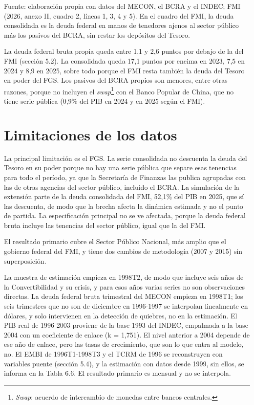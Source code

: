 Fuente: elaboración propia con datos del MECON, el BCRA y el INDEC; FMI
(2026, anexo II, cuadro 2, líneas 1, 3, 4 y 5). En el cuadro del FMI, la
deuda consolidada es la deuda federal en manos de tenedores ajenos al
sector público más los pasivos del BCRA, sin restar los depósitos del
Tesoro.

La deuda federal bruta propia queda entre 1,1 y 2,6 puntos por debajo de
la del FMI (sección 5.2). La consolidada queda 17,1 puntos por encima en
2023, 7,5 en 2024 y 8,9 en 2025, sobre todo porque el FMI resta también
la deuda del Tesoro en poder del FGS. Los pasivos del BCRA propios son
menores, entre otras razones, porque no incluyen el
\emph{swap}\footnote{\emph{Swap}: acuerdo de intercambio de monedas
  entre bancos centrales.} con el Banco Popular de China, que no tiene
serie pública (0,9\% del PIB en 2024 y en 2025 según el FMI).

\section{Limitaciones de los datos}

La principal limitación es el FGS. La serie consolidada no descuenta la
deuda del Tesoro en su poder porque no hay una serie pública que separe
esas tenencias para todo el período, ya que la Secretaría de Finanzas
las publica agrupadas con las de otras agencias del sector público,
incluido el BCRA. La simulación de la extensión parte de la deuda
consolidada del FMI, 52,1\% del PIB en 2025, que sí las descuenta, de
modo que la brecha afecta la dinámica estimada y no el punto de partida.
La especificación principal no se ve afectada, porque la deuda federal
bruta incluye las tenencias del sector público, igual que la del FMI.

El resultado primario cubre el Sector Público Nacional, más amplio que
el gobierno federal del FMI, y tiene dos cambios de metodología (2007 y
2015) sin superposición.

La muestra de estimación empieza en 1998T2, de modo que incluye seis
años de la Convertibilidad y su crisis, y para esos años varias series
no son observaciones directas. La deuda federal bruta trimestral del
MECON empieza en 1998T1; los seis trimestres que no son de diciembre en
1996-1997 se interpolan linealmente en dólares, y solo intervienen en la
detección de quiebres, no en la estimación. El PIB real de 1996-2003
proviene de la base 1993 del INDEC, empalmada a la base 2004 con un
coeficiente de enlace (k = 1,751). El nivel anterior a 2004 depende de
ese año de enlace, pero las tasas de crecimiento, que son lo que entra
al modelo, no. El EMBI de 1996T1-1998T3 y el TCRM de 1996 se
reconstruyen con variables puente (sección 5.4), y la estimación con
datos desde 1999, sin ellos, se informa en la Tabla 6.6. El resultado
primario es mensual y no se interpola.
